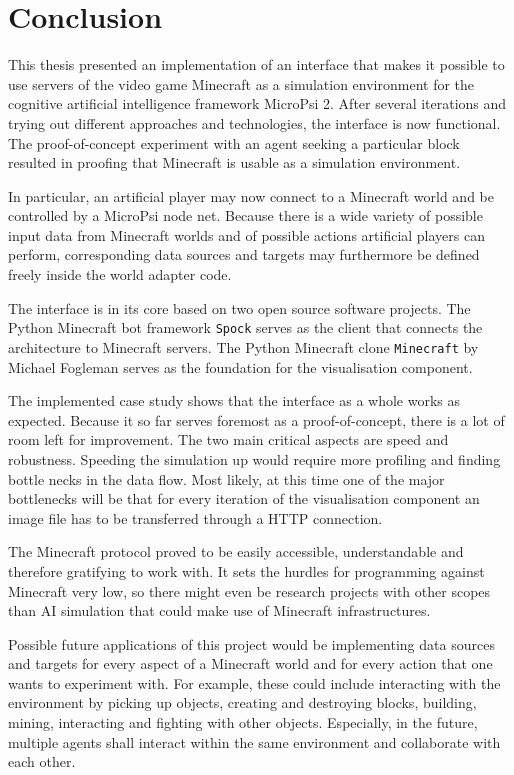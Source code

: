 \chapter{Conclusion}
\label{chap:5}
This thesis presented an implementation of an interface that makes it possible to use servers of the video game Minecraft as a simulation environment for the cognitive artificial intelligence framework MicroPsi 2. After several iterations and trying out different approaches and technologies, the interface is now functional. The proof-of-concept experiment with an agent seeking a particular block resulted in proofing that Minecraft is usable as a simulation environment.

In particular, an artificial player may now connect to a Minecraft world and be controlled by a MicroPsi node net. Because there is a wide variety of possible input data from Minecraft worlds and of possible actions artificial players can perform, corresponding data sources and targets may furthermore be defined freely inside the world adapter code.

The interface is in its core based on two open source software projects. The Python Minecraft bot framework \texttt{Spock} serves as the client that connects the architecture to Minecraft servers. The Python Minecraft clone \texttt{Minecraft} by Michael Fogleman serves as the foundation for the visualisation component.

The implemented case study shows that the interface as a whole works as expected. Because it so far serves foremost as a proof-of-concept, there is a lot of room left for improvement. The two main critical aspects are speed and robustness. Speeding the simulation up would require more profiling and finding bottle necks in the data flow. Most likely, at this time one of the major bottlenecks will be that for every iteration of the visualisation component an image file has to be transferred through a HTTP connection.

The Minecraft protocol proved to be easily accessible, understandable and therefore gratifying to work with. It sets the hurdles for programming against Minecraft very low, so there might even be research projects with other scopes than AI simulation that could make use of Minecraft infrastructures.

Possible future applications of this project would be implementing data sources and targets for every aspect of a Minecraft world and for every action that one wants to experiment with. For example, these could include interacting with the environment by picking up objects, creating and destroying blocks, building, mining, interacting and fighting with other objects. Especially, in the future, multiple agents shall interact within the same environment and collaborate with each other.

